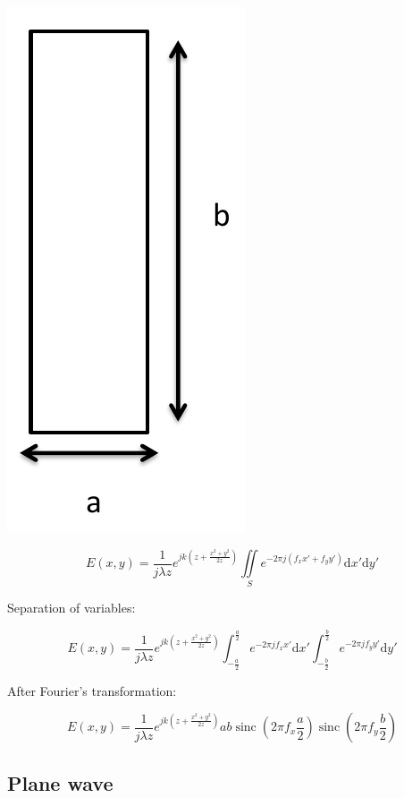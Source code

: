 \documentclass[10pt,a4paper]{article}
\DeclareMathOperator{\sinc}{sinc}
\begin{document}
\begin{center}
\includegraphics[scale=0.3]{../Ressources/schema-4-1.png}
\end{center}

\[E(x,y)=\frac{1}{j\lambda z} e^{jk\left(z+\frac{x^2+y^2}{2z}\right)}\iint\limits_S e^{-2\pi j(f_xx'+f_yy')}\mathrm{d}x'\mathrm{d}y'\]

Separation of variables:

\[
E(x,y)=\frac{1}{j\lambda z} e^{jk\left(z+\frac{x^2+y^2}{2z}\right)}
\int_{-\frac{a}{2}}^\frac{a}{2} e^{-2\pi jf_xx'}\mathrm{d}x'
\int_{-\frac{b}{2}}^\frac{b}{2} e^{-2\pi jf_yy'}\mathrm{d}y'
\]

After Fourier’s transformation:

\[
E(x,y)=\frac{1}{j\lambda z} e^{jk\left(z+\frac{x^2+y^2}{2z}\right)}ab
\sinc\left(2\pi f_x \frac{a}{2}\right)
\sinc\left(2\pi f_y \frac{b}{2}\right)
\]

\subsection{Plane wave}
\end{document}
